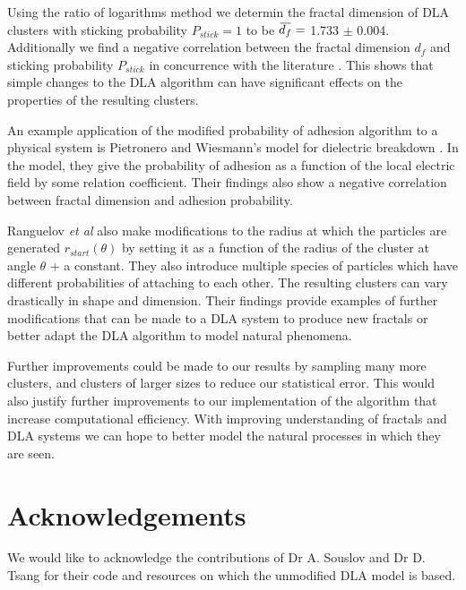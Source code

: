 \documentclass[10pt, twocolumn]{article} %
\newcommand{\overbar}[1]{\mkern 1.5mu\overline{\mkern-1.5mu#1\mkern-1.5mu}\mkern 1.5mu}
\begin{document}
  Using the ratio of logarithms method we determin the fractal dimension of DLA clusters with sticking probability $P_{stick} = 1$ to be $\overbar{d_f} =$ 1.733 $\pm$ 0.004. Additionally we find a negative correlation between the fractal dimension $d_f$ and sticking probability $P_{stick}$ in concurrence with the literature \cite{Ranguelov_2011, Pietronero_1984}. This shows that simple changes to the DLA algorithm can have significant effects on the properties of the resulting clusters.
  
  An example application of the modified probability of adhesion algorithm to a physical system is Pietronero and Wiesmann's model for dielectric breakdown \cite{Pietronero_1984}. In the model, they give the probability of adhesion as a function of the local electric field by some relation coefficient. Their findings also show a negative correlation between fractal dimension and adhesion probability.

  Ranguelov \textit{et al} also make modifications to the radius at which the particles are generated $r_{start}(\theta)$ by setting it as a function of the radius of the cluster at angle $\theta$ + a constant. They also introduce multiple species of particles which have different probabilities of attaching to each other. The resulting clusters can vary drastically in shape and dimension. Their findings provide examples of further modifications that can be made to a DLA system to produce new fractals or better adapt the DLA algorithm to model natural phenomena.

  Further improvements could be made to our results by sampling many more clusters, and clusters of larger sizes to reduce our statistical error. This would also justify further improvements to our implementation of the algorithm that increase computational efficiency. With improving understanding of fractals and DLA systems we can hope to better model the natural processes in which they are seen.

\section*{Acknowledgements}
We would like to acknowledge the contributions of Dr A. Souslov and Dr D. Tsang for their code and resources on which the unmodified DLA model is based.




\clearpage

\onecolumn
\end{document}
